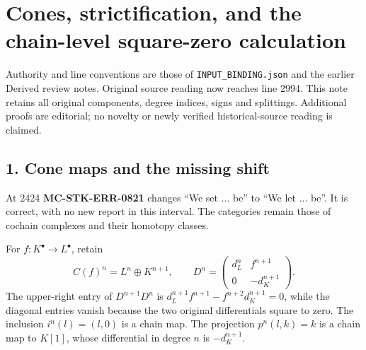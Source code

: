 \section{\texorpdfstring{Cones,\allowbreak{} strictification,\allowbreak{} and the chain-level square-zero calculation}{  and the chain-level square-zero calculation}}\label{proofs-2419-2994-cones-strictification-and-the-chain-level-square-zero-calculation}

Authority and line conventions are those of \texttt{INPUT\_\allowbreak{}BINDING.\allowbreak{}json} and the earlier Derived review notes. Original source reading now reaches line 2994. This note retains all original components,\allowbreak{} degree indices,\allowbreak{} signs and splittings. Additional proofs are editorial; no novelty or newly verified historical-source reading is claimed.

\subsection{1. Cone maps and the missing shift}\label{proofs-2419-2994-cone-maps-and-the-missing-shift}

At 2424 \textbf{MC-STK-ERR-0821} changes ``We set ... be'' to ``We let ... be''. It is correct,\allowbreak{} with no new report in this interval. The categories remain those of cochain complexes and their homotopy classes.

For \(f:K^\bullet\to L^\bullet\),\allowbreak{} retain \[
C(f)^n=L^n\oplus K^{n+1},\qquad
D^n=\begin{pmatrix}d_L^n&f^{n+1}\\0&-d_K^{n+1}\end{pmatrix}.
\] The upper-right entry of \(D^{n+1}D^n\) is \(d_L^{n+1}f^{n+1}-f^{n+2}d_K^{n+1}=0\),\allowbreak{} while the diagonal entries vanish because the two original differentials square to zero. The inclusion \(i^n(l)=(l,0)\) is a chain map. The projection \(p^n(l,k)=k\) is a chain map to \(K[1]\),\allowbreak{} whose differential in degree \(n\) is \(-d_K^{n+1}\).

